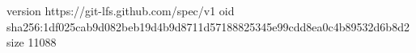 version https://git-lfs.github.com/spec/v1
oid sha256:1df025cab9d082beb19d4b9d8711d57188825345e99cdd8ea0c4b89532d6b8d2
size 11088
